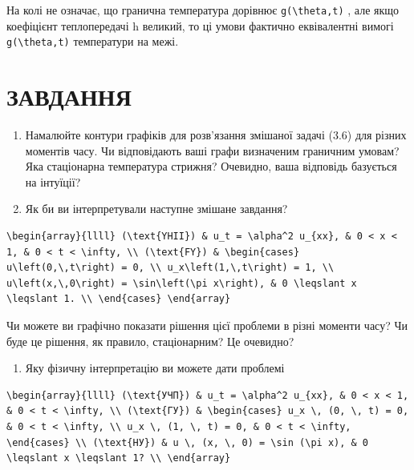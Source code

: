 \documentclass[
  ukrainian,
]{article}
\providecommand{\tightlist}{%
  \setlength{\itemsep}{0pt}\setlength{\parskip}{0pt}}
\begin{document}
На колі не означає, що гранична температура дорівнює
\texttt{g(\textbackslash{}theta,t)} , але якщо коефіцієнт теплопередачі
h великий, то ці умови фактично еквівалентні вимогі
\texttt{g(\textbackslash{}theta,t)} температури на межі.

\section{ЗАВДАННЯ}\label{ux437ux430ux432ux434ux430ux43dux43dux44f-1}

\begin{enumerate}
\def\labelenumi{\arabic{enumi}.}
\item
  Намалюйте контури графіків для розв'язання змішаної задачі (3.6) для
  різних моментів часу. Чи відповідають ваші графи визначеним граничним
  умовам? Яка стаціонарна температура стрижня? Очевидно, ваша відповідь
  базується на інтуїції?
\item
  Як би ви інтерпретували наступне змішане завдання?
\end{enumerate}

\begin{verbatim}
\begin{array}{llll} (\text{YHII}) & u_t = \alpha^2 u_{xx}, & 0 < x < 1, & 0 < t < \infty, \\ (\text{FY}) & \begin{cases} u\left(0,\,t\right) = 0, \\ u_x\left(1,\,t\right) = 1, \\ u\left(x,\,0\right) = \sin\left(\pi x\right), & 0 \leqslant x \leqslant 1. \\ \end{cases} \end{array}
\end{verbatim}

Чи можете ви графічно показати рішення цієї проблеми в різні моменти
часу? Чи буде це рішення, як правило, стаціонарним? Це очевидно?

\begin{enumerate}
\def\labelenumi{\arabic{enumi}.}
\setcounter{enumi}{2}
\tightlist
\item
  Яку фізичну інтерпретацію ви можете дати проблемі
\end{enumerate}

\begin{verbatim}
\begin{array}{llll} (\text{УЧП}) & u_t = \alpha^2 u_{xx}, & 0 < x < 1, & 0 < t < \infty, \\ (\text{ГУ}) & \begin{cases} u_x \, (0, \, t) = 0, & 0 < t < \infty, \\ u_x \, (1, \, t) = 0, & 0 < t < \infty, \end{cases} \\ (\text{НУ}) & u \, (x, \, 0) = \sin (\pi x), & 0 \leqslant x \leqslant 1? \\ \end{array}
\end{verbatim}
\end{document}

